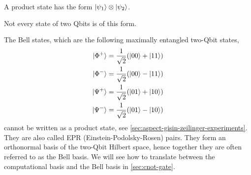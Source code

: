 \begin{definition}
A product state has the form
\(
\ket{\psi_1}\otimes\ket{\psi_2}
\).
\end{definition}


Not every state of two Qbits is of this form.
\begin{example}
\label{ex:bell-states}
The Bell states, which are the following maximally entangled two-Qbit states,
\[
\begin{aligned}
\ket{\Phi^+}
&=
\frac{1}{\sqrt{2}}(\ket{00}+\ket{11}) \\
\ket{\Phi^-}
&=
\frac{1}{\sqrt{2}}(\ket{00}-\ket{11}) \\
\ket{\Psi^+}
&=
\frac{1}{\sqrt{2}}(\ket{01}+\ket{10}) \\
\ket{\Psi^-}
&=
\frac{1}{\sqrt{2}}(\ket{01}-\ket{10})
\end{aligned}
\]
cannot be written as a product state,
see \autoref{sec:aspect-gisin-zeilinger-experiments}.
They are also called EPR (Einstein-Po\-dol\-sky-Rosen) pairs. 
They form an orthonormal basis of the two-Qbit Hilbert space, hence together they are often referred to as the Bell basis.
We will see how to translate between the computational basis and the Bell basis in \autoref{sec:cnot-gate}.
\end{example}


